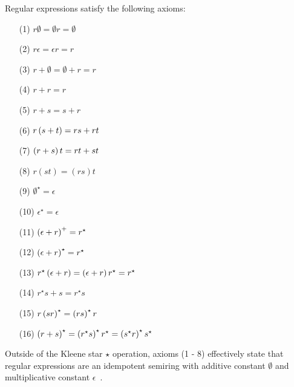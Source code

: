 \documentclass[12pt]{article}
\begin{document}
\begin{theorem}
Regular expressions satisfy the following axioms:
\begin{enumerate}
  \item[(1)]
    \(r \emptyset = \emptyset r = \emptyset\)

  \item[(2)]
    \(r \epsilon = \epsilon r = r\)

  \item[(3)]
    \(r + \emptyset = \emptyset + r = r\)

  \item[(4)]
    \(r + r = r\)

  \item[(5)]
    \(r + s = s + r\)

  \item[(6)]
    \(r\left(s + t\right) = rs + rt\)

  \item[(7)]
    \(\left(r + s\right)t = rt + st\)

  \item[(8)]
    \(r(st) = (rs)t\)

  \item[(9)]
    \(\emptyset^\star = \epsilon\)

  \item[(10)]
    \(\epsilon^\star = \epsilon\)

  \item[(11)]
    \(\left(\epsilon + r\right)^+ = r^\star\)

  \item[(12)]
    \(\left(\epsilon + r\right)^\star = r^\star\)

  \item[(13)]
    \(r^\star \left(\epsilon + r\right) = \left(\epsilon + r\right)r^\star = r^\star\)

  \item[(14)]
    \(r^\star s + s = r^\star s\)

  \item[(15)]
    \(r\left(sr\right)^\star = \left(rs\right)^\star r\)

  \item[(16)]
    \(\left(r + s\right)^\star = \left(r^\star s\right)^\star r^\star = \left(s^\star r\right)^\star s^\star\)

\end{enumerate}

\end{theorem}

Outside of the Kleene star \(\star\) operation, axioms (1 - 8)
effectively state that regular expressions are an
idempotent semiring with additive constant \(\emptyset\) and multiplicative
constant \(\epsilon\)~\cite{infoandcomp-kozen1994kleenealg}.
\end{document}
